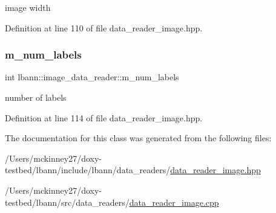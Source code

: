 image width 



Definition at line 110 of file data\+\_\+reader\+\_\+image.\+hpp.

\mbox{\label{classlbann_1_1image__data__reader_af280e8758a6ec3acee7c62e6351d17e0}} 
\subsubsection{\texorpdfstring{m\+\_\+num\+\_\+labels}{m\_num\_labels}}
{\footnotesize\ttfamily int lbann\+::image\+\_\+data\+\_\+reader\+::m\+\_\+num\+\_\+labels\hspace{0.3cm}{\ttfamily [protected]}}



number of labels 



Definition at line 114 of file data\+\_\+reader\+\_\+image.\+hpp.



The documentation for this class was generated from the following files\+:\begin{DoxyCompactItemize}
\item 
/\+Users/mckinney27/doxy-\/testbed/lbann/include/lbann/data\+\_\+readers/\hyperlink{data__reader__image_8hpp}{data\+\_\+reader\+\_\+image.\+hpp}\item 
/\+Users/mckinney27/doxy-\/testbed/lbann/src/data\+\_\+readers/\hyperlink{data__reader__image_8cpp}{data\+\_\+reader\+\_\+image.\+cpp}\end{DoxyCompactItemize}
